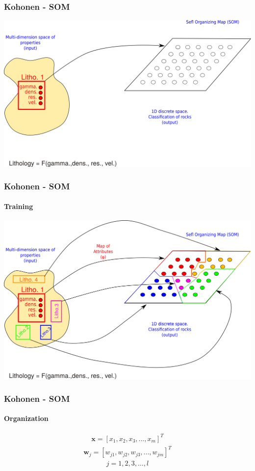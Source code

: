 \documentclass[aspectratio=10]{beamer} %
\begin{document}
\begin{frame}
 \frametitle{Kohonen - SOM}
 \includegraphics[scale=0.5]{Imagens/Introkoho3.png} 
\end{frame}


\begin{frame}
	\frametitle{Kohonen - SOM}
	\framesubtitle{Training}
	\includegraphics[scale=0.5]{Imagens/Introkoho4.png} 
\end{frame}

\begin{frame}
	\frametitle{Kohonen - SOM}
	\framesubtitle{Organization}

	\begin{eqnarray}
	\textbf{x}=[x_{1}, x_{2}, x_{3}, ..., x_{m}]^{T} \nonumber
	\end{eqnarray}
	\pause
	\begin{eqnarray}
	\textbf{w}_{j}= [w_{j1}, w_{j2}, w_{j3}, ..., w_{jm}]^{T} \nonumber
	\end{eqnarray}
	\pause
	\begin{eqnarray}
	j=1,2,3,\hdots,l \nonumber
	\end{eqnarray}
\end{frame}
\end{document}
